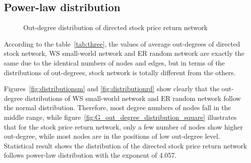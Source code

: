 \subsection{Power-law distribution}
\begin{figure}
	\hfill%
	\caption{Out-degree distribution of directed stock price return network} \label{fig:outdegreedistribution}
\end{figure}

According to the table~\ref{tab:three}, the values of average out-degrees of directed stock network, WS small-world network and ER random network are exactly the same due to the identical numbers of nodes and edges, but in terms of the distributions of out-degrees, stock network is totally different from the others. 

Figures~\ref{fig:distributionsm} and \ref{fig:distributionrd} show clearly that the out-degree distributions of WS small-world network and ER random network follow the normal distribution. Therefore, most degree numbers of nodes fall in the middle range, while figure~\ref{fig:G_out_degree_distribution_square} illustrates that for the stock price return network, only a few number of nodes show higher out-degree, while most nodes are in the positions of low out-degree level. Statistical result shows the distribution of the directed stock price return network follows power-law distribution with the exponent of 4.057.

